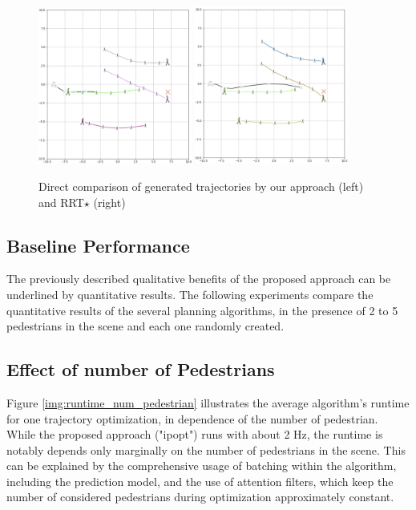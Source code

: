 \begin{figure}[!ht]
\begin{center}
\includegraphics[width=0.45\textwidth]{images/show_case_ipopt.png}
\includegraphics[width=0.45\textwidth]{images/show_case_rrt.png}
\end{center}
\caption{Direct comparison of generated trajectories by our approach (left) and \ac{RRT}$\star$ \cite{Karaman2011} (right)}
\label{img:show_case}
\end{figure}

\subsection{Baseline Performance}
The previously described qualitative benefits of the proposed approach can be underlined by quantitative results. The following experiments compare the quantitative results of the several planning algorithms, in the presence of 2 to 5 pedestrians in the scene and each one randomly created. 

\subsection{Effect of number of Pedestrians}
Figure \ref{img:runtime_num_pedestrian} illustrates the average algorithm's runtime for one trajectory optimization, in dependence of the number of pedestrian. While the proposed approach ("ipopt") runs with about 2 Hz, the runtime is notably depends only marginally on the number of pedestrians in the scene. This can be explained by the comprehensive usage of batching within the algorithm, including the prediction model, and the use of attention filters, which keep the number of considered pedestrians during optimization approximately constant.

